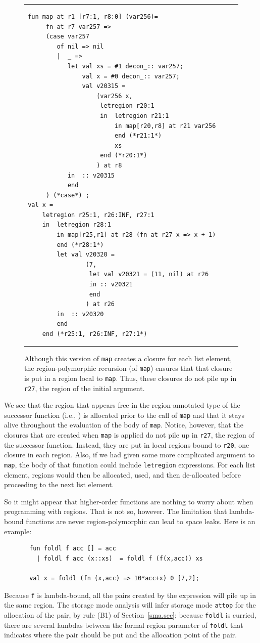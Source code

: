 \documentclass[12pt]{book}
\begin{document}
\begin{figure}
\hrule \medskip
\begin{verbatim}
 fun map at r1 [r7:1, r8:0] (var256)= 
      fn at r7 var257 => 
      (case var257 
         of nil => nil
         |  _ => 
            let val xs = #1 decon_:: var257; 
                val x = #0 decon_:: var257; 
                val v20315 = 
                    (var256 x, 
                     letregion r20:1 
                     in  letregion r21:1 
                         in map[r20,r8] at r21 var256 
                         end (*r21:1*) 
                         xs 
                     end (*r20:1*)
                    ) at r8
            in  :: v20315
            end 
      ) (*case*) ; 
 val x = 
     letregion r25:1, r26:INF, r27:1 
     in  letregion r28:1 
         in map[r25,r1] at r28 (fn at r27 x => x + 1) 
         end (*r28:1*) 
         let val v20320 = 
                 (7, 
                  let val v20321 = (11, nil) at r26 
                  in :: v20321 
                  end 
                 ) at r26
         in  :: v20320
         end  
     end (*r25:1, r26:INF, r27:1*)
\end{verbatim}
\caption{Although this version of {\tt map} creates a closure for
  each list element, the region-polymorphic recursion (of {\tt map})
  ensures that that closure is put in a region local to {\tt map}.
  Thus, these closures do not pile up in {\tt r27}, the region of the
  initial argument.} 
\medskip \hrule
\label{map.fig}
\end{figure}
We see that the region that appears free in the region-annotated type of the successor
function (i.e., ) is allocated prior 
to the call of {\tt map} and that it stays
alive throughout the evaluation of the body of {\tt map}. Notice, however, that
the closures that are created when {\tt map} is applied do not pile up in
{\tt r27}, the region of the successor function. Instead, they are put
in local regions bound to {\tt r20}, one closure in each region. 
Also, if we had given some
more complicated argument to {\tt map}, the body of that function could include
{\tt letregion} expressions. For each list element, regions would then be
allocated, used, and then de-allocated before proceeding to the next list element.

So it might appear that higher-order functions are nothing to worry about when
programming with regions. That is not so, however. The limitation that lambda-bound
functions are never region-polymorphic can lead to space leaks. Here is an example:
\begin{verbatim}
       fun foldl f acc [] = acc
         | foldl f acc (x::xs)  = foldl f (f(x,acc)) xs

       val x = foldl (fn (x,acc) => 10*acc+x) 0 [7,2];
\end{verbatim}
Because {\tt f} is lambda-bound, all the pairs created by the expression 
will pile up in the same region. The storage mode analysis will infer storage mode {\tt attop}
for the allocation of the pair, by rule (B1) of Section~\ref{sma.sec}; because {\tt foldl} is
curried, 
there are several lambdas between the formal region parameter of {\tt foldl} that indicates
where the pair should be put and the allocation point of the pair.
\end{document}
